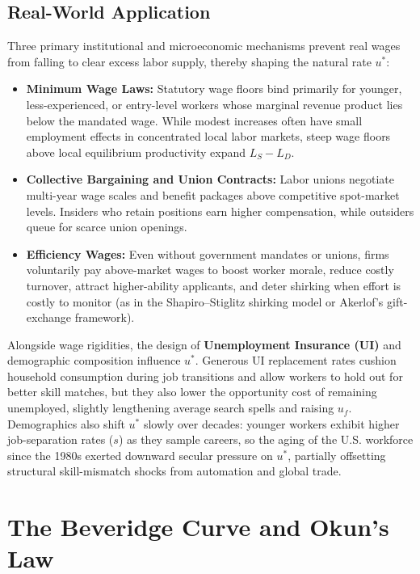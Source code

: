 \documentclass[11pt, a4paper]{article}
\begin{document}
\subsection*{Real-World Application}
Three primary institutional and microeconomic mechanisms prevent real wages from falling to clear excess labor supply, thereby shaping the natural rate $u^*$:
\begin{itemize}[leftmargin=1.5em, itemsep=3pt]
  \item \textbf{Minimum Wage Laws:} Statutory wage floors bind primarily for younger, less-experienced, or entry-level workers whose marginal revenue product lies below the mandated wage. While modest increases often have small employment effects in concentrated local labor markets, steep wage floors above local equilibrium productivity expand $L_S - L_D$.
  \item \textbf{Collective Bargaining and Union Contracts:} Labor unions negotiate multi-year wage scales and benefit packages above competitive spot-market levels. Insiders who retain positions earn higher compensation, while outsiders queue for scarce union openings.
  \item \textbf{Efficiency Wages:} Even without government mandates or unions, firms voluntarily pay above-market wages to boost worker morale, reduce costly turnover, attract higher-ability applicants, and deter shirking when effort is costly to monitor (as in the Shapiro--Stiglitz shirking model or Akerlof's gift-exchange framework).
\end{itemize}
Alongside wage rigidities, the design of \textbf{Unemployment Insurance (UI)} and demographic composition influence $u^*$. Generous UI replacement rates cushion household consumption during job transitions and allow workers to hold out for better skill matches, but they also lower the opportunity cost of remaining unemployed, slightly lengthening average search spells and raising $u_f$. Demographics also shift $u^*$ slowly over decades: younger workers exhibit higher job-separation rates ($s$) as they sample careers, so the aging of the U.S. workforce since the 1980s exerted downward secular pressure on $u^*$, partially offsetting structural skill-mismatch shocks from automation and global trade.

\section{The Beveridge Curve and Okun's Law}
\end{document}
